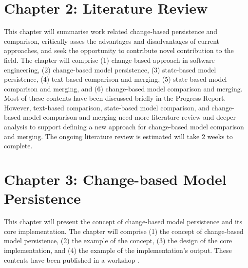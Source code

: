\documentclass[12pt, a4paper]{report} \usepackage[titletoc]{appendix}
\begin{document}
\section{Chapter 2: Literature Review}
\label{sec:chapter_2_literature_review_plan}
This chapter will summarise work related change-based persistence and comparison, critically asses the advantages and disadvantages of current approaches, and seek the opportunity to contribute novel contribution to the field. The chapter will comprise (1) change-based approach in software engineering, (2) change-based model persistence, (3) state-based model persistence, (4) text-based comparison and merging, (5) state-based model comparison and merging, and (6) change-based model comparison and merging. Most of these contents have been discussed briefly in the Progress Report. However, text-based comparison, state-based model comparison, and change-based model comparison and merging need more literature review and deeper analysis to support defining a new approach for change-based model comparison and merging. The ongoing literature review is estimated will take 2 weeks to complete. 


\section{Chapter 3: Change-based Model Persistence}
\label{sec:chapter_3_Change-based_model_ersistence_plan}
This chapter will present the concept of change-based model persistence and its core implementation. The chapter will comprise (1) the concept of change-based model persistence, (2) the example of the concept, (3) the design of the core implementation, and (4) the example of the implementation's output. These contents have been published in a workshop \cite{DBLP:conf/models/YohannisKP17}.
\end{document}
